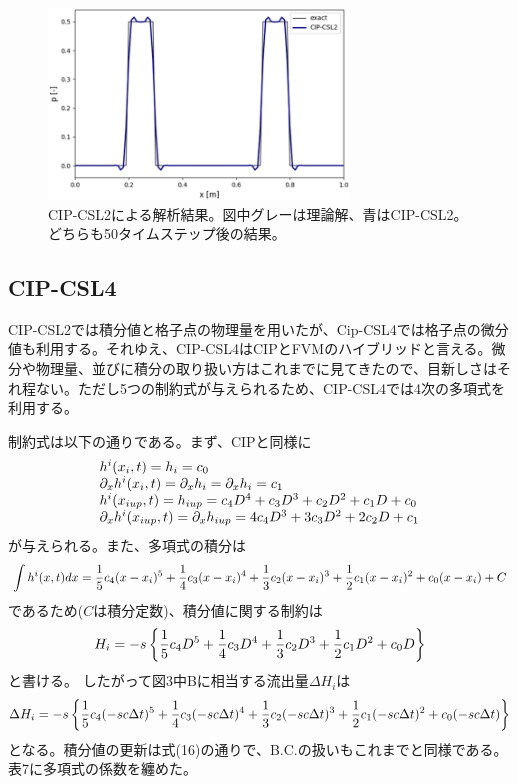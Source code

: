 \documentclass[dvipdfmx, 9pt, a4paper]{jsarticle}
\begin{document}
\begin{figure}[t]
\begin{center}
\includegraphics[width=8cm]{"fig8.png"}
\caption{CIP-CSL2による解析結果。図中グレーは理論解、青はCIP-CSL2。どちらも50タイムステップ後の結果。}
\end{center}
\end{figure}

\subsection{CIP-CSL4}
CIP-CSL2では積分値と格子点の物理量を用いたが、Cip-CSL4では格子点の微分値も利用する。それゆえ、CIP-CSL4はCIPとFVMのハイブリッドと言える。微分や物理量、並びに積分の取り扱い方はこれまでに見てきたので、目新しさはそれ程ない。ただし5つの制約式が与えられるため、CIP-CSL4では4次の多項式を利用する。\par

制約式は以下の通りである。まず、CIPと同様に
\begin{equation}
\begin{array}{l}
h^i(x_i, t)=h_i=c_0 \\
\partial_xh^i(x_i, t)=\partial_xh_i=\partial_xh_i=c_1 \\
h^i(x_{iup}, t)=h_{iup}=c_4D^4+c_3D^3+c_2D^2+c_1D+c_0 \\
\partial_xh^i(x_{iup}, t)=\partial_xh_{iup}=4c_4D^3+3c_3D^2+2c_2D+c_1
\end{array} \notag
\end{equation}
が与えられる。また、多項式の積分は
\begin{equation}
\int h^i(x, t)dx=\frac{1}{5}c_4(x-x_i)^5+\frac{1}{4}c_3(x-x_i)^4+\frac{1}{3}c_2(x-x_i)^3+
\frac{1}{2}c_1(x-x_i)^2+c_0(x-x_i)+C \notag
\end{equation}
であるため($C$は積分定数)、積分値に関する制約は
\begin{equation}
H_i = -s\left\{ \frac{1}{5}c_4D^5+\frac{1}{4}c_3D^4+\frac{1}{3}c_2D^3+
\frac{1}{2}c_1D^2+c_0D \right\} \notag
\end{equation}
と書ける。
したがって図3中Bに相当する流出量$\Delta H_i$は
\begin{equation}
\Delta H_i=-s\left\{ 
\frac{1}{5}c_4(-sc\Delta t)^5+\frac{1}{4}c_3(-sc\Delta t)^4+\frac{1}{3}c_2(-sc\Delta t)^3+\frac{1}{2}c_1(-sc\Delta t)^2+c_0(-sc\Delta t)\right\} \notag
\end{equation}
となる。積分値の更新は式(16)の通りで、B.C.の扱いもこれまでと同様である。表7に多項式の係数を纏めた。\par
\end{document}
